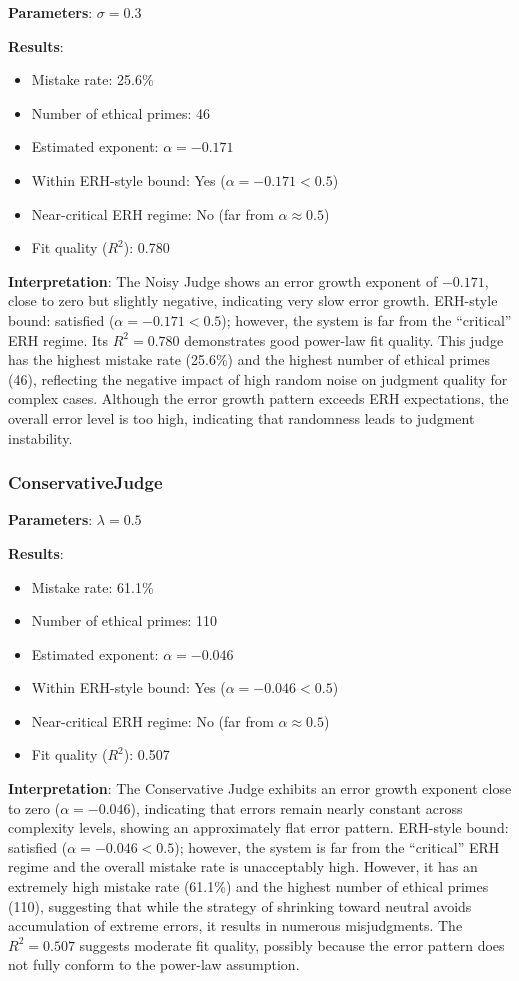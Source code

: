 \documentclass[12pt,a4paper]{article}
\theoremstyle{definition}
\theoremstyle{remark}
\begin{document}
\textbf{Parameters}: $\sigma = 0.3$

\textbf{Results}:
\begin{itemize}
    \item Mistake rate: 25.6\%
    \item Number of ethical primes: 46
    \item Estimated exponent: $\alpha = -0.171$
    \item Within ERH-style bound: Yes ($\alpha = -0.171 < 0.5$)
    \item Near-critical ERH regime: No (far from $\alpha \approx 0.5$)
    \item Fit quality ($R^2$): 0.780
\end{itemize}

\textbf{Interpretation}: The Noisy Judge shows an error growth exponent of $-0.171$, close to zero but slightly negative, indicating very slow error growth. ERH-style bound: satisfied ($\alpha = -0.171 < 0.5$); however, the system is far from the ``critical'' ERH regime. Its $R^2 = 0.780$ demonstrates good power-law fit quality. This judge has the highest mistake rate (25.6\%) and the highest number of ethical primes (46), reflecting the negative impact of high random noise on judgment quality for complex cases. Although the error growth pattern exceeds ERH expectations, the overall error level is too high, indicating that randomness leads to judgment instability.

\subsubsection{ConservativeJudge}

\textbf{Parameters}: $\lambda = 0.5$

\textbf{Results}:
\begin{itemize}
    \item Mistake rate: 61.1\%
    \item Number of ethical primes: 110
    \item Estimated exponent: $\alpha = -0.046$
    \item Within ERH-style bound: Yes ($\alpha = -0.046 < 0.5$)
    \item Near-critical ERH regime: No (far from $\alpha \approx 0.5$)
    \item Fit quality ($R^2$): 0.507
\end{itemize}

\textbf{Interpretation}: The Conservative Judge exhibits an error growth exponent close to zero ($\alpha = -0.046$), indicating that errors remain nearly constant across complexity levels, showing an approximately flat error pattern. ERH-style bound: satisfied ($\alpha = -0.046 < 0.5$); however, the system is far from the ``critical'' ERH regime and the overall mistake rate is unacceptably high. However, it has an extremely high mistake rate (61.1\%) and the highest number of ethical primes (110), suggesting that while the strategy of shrinking toward neutral avoids accumulation of extreme errors, it results in numerous misjudgments. The $R^2 = 0.507$ suggests moderate fit quality, possibly because the error pattern does not fully conform to the power-law assumption.
\end{document}
